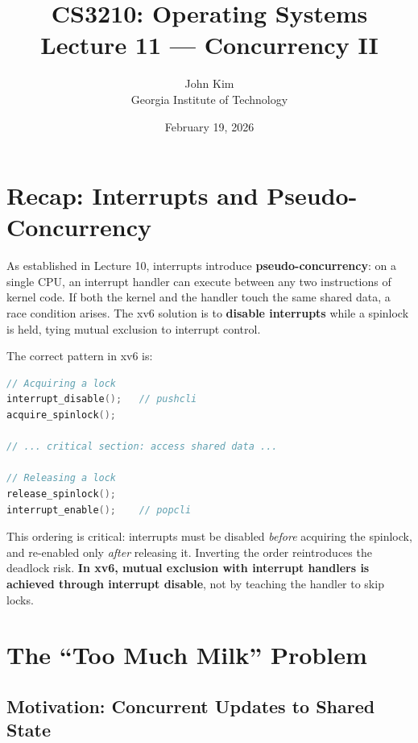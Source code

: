 \documentclass[11pt]{article}
\title{\textbf{CS3210: Operating Systems} \\ Lecture 11 --- Concurrency II}
\author{John Kim \\ Georgia Institute of Technology}
\date{February 19, 2026}
\begin{document}
\maketitle
\tableofcontents
\newpage

\section{Recap: Interrupts and Pseudo-Concurrency}

As established in Lecture 10, interrupts introduce \textbf{pseudo-concurrency}: on a single CPU, an interrupt handler can execute between any two instructions of kernel code. If both the kernel and the handler touch the same shared data, a race condition arises. The xv6 solution is to \textbf{disable interrupts} while a spinlock is held, tying mutual exclusion to interrupt control.

The correct pattern in xv6 is:

\begin{lstlisting}[language=C, caption={xv6 interrupt-safe locking (conceptual)}]
// Acquiring a lock
interrupt_disable();   // pushcli
acquire_spinlock();

// ... critical section: access shared data ...

// Releasing a lock
release_spinlock();
interrupt_enable();    // popcli
\end{lstlisting}

This ordering is critical: interrupts must be disabled \emph{before} acquiring the spinlock, and re-enabled only \emph{after} releasing it. Inverting the order reintroduces the deadlock risk. \textbf{In xv6, mutual exclusion with interrupt handlers is achieved through interrupt disable}, not by teaching the handler to skip locks.

\section{The ``Too Much Milk'' Problem}

\subsection{Motivation: Concurrent Updates to Shared State}
\end{document}
